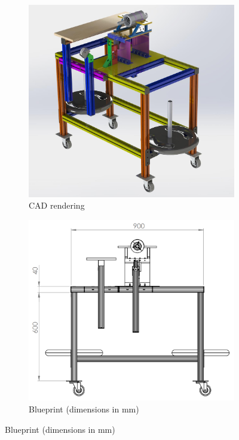 \documentclass[tcc]{subfiles}
\begin{document}
\begin{figure}[p]
    \centering
    \caption{Test bench}
    \label{fig:test_bench}
    \begin{subfigure}{.49\textwidth}
        \includegraphics[width=.9\textwidth]{fig/test_bench_rendering.jpg}
        \caption{\acs{CAD} rendering}
        \label{fig:test_bench!rendering}
    \end{subfigure}
    \begin{subfigure}{.49\textwidth}
        \includegraphics[width=.9\textwidth]{fig/test_bench_drawing.png}
        \caption{Blueprint (dimensions in mm)}
        \label{fig:test_bench!blueprint}
    \end{subfigure}


\end{figure}
\end{document}
